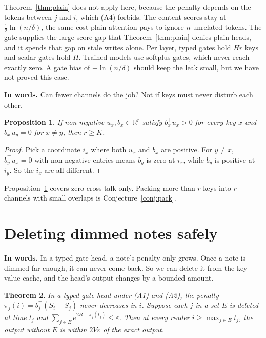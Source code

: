 \documentclass[10pt]{article}
\newtheorem{theorem}{Theorem}
\newtheorem{proposition}[theorem]{Proposition}
\theoremstyle{definition}
\theoremstyle{remark}
\newcommand{\R}{\mathbb{R}}
\newcommand{\inwords}[1]{\par\smallskip\noindent\textbf{In words.} #1\par\smallskip}
\begin{document}
Theorem~\ref{thm:plain} does not apply here, because the penalty depends on the tokens between $j$ and $i$, which (A4) forbids. The content scores stay at $\frac12\ln(n/\delta)$, the same cost plain attention pays to ignore $n$ unrelated tokens. The gate supplies the large score gap that Theorem~\ref{thm:plain} denies plain heads, and it spends that gap on stale writes alone. Per layer, typed gates hold $Hr$ keys and scalar gates hold $H$. Trained models use softplus gates, which never reach exactly zero. A gate bias of $-\ln(n/\delta)$ should keep the leak small, but we have not proved this case.

\inwords{Can fewer channels do the job? Not if keys must never disturb each other.}

\begin{proposition}\label{prop:rank}
If non-negative $u_x, b_x \in \R^r$ satisfy $b_x^\top u_x > 0$ for every key $x$ and $b_x^\top u_y = 0$ for $x \ne y$, then $r \ge K$.
\end{proposition}

\begin{proof}
Pick a coordinate $i_x$ where both $u_x$ and $b_x$ are positive. For $y \ne x$, $b_y^\top u_x = 0$ with non-negative entries means $b_y$ is zero at $i_x$, while $b_y$ is positive at $i_y$. So the $i_x$ are all different.
\end{proof}

Proposition~\ref{prop:rank} covers zero cross-talk only. Packing more than $r$ keys into $r$ channels with small overlaps is Conjecture~\ref{conj:pack}.

\section{Deleting dimmed notes safely}\label{sec:evict}

\inwords{In a typed-gate head, a note's penalty only grows. Once a note is dimmed far enough, it can never come back. So we can delete it from the key-value cache, and the head's output changes by a bounded amount.}

\begin{theorem}\label{thm:evict}
In a typed-gate head under (A1) and (A2), the penalty $\pi_j(i) = b_j^\top (S_i - S_j)$ never decreases in $i$. Suppose each $j$ in a set $E$ is deleted at time $t_j$ and $\sum_{j \in E} e^{2B - \pi_j(t_j)} \le \varepsilon$. Then at every reader $i \ge \max_{j \in E} t_j$, the output without $E$ is within $2V\varepsilon$ of the exact output.
\end{theorem}
\end{document}
